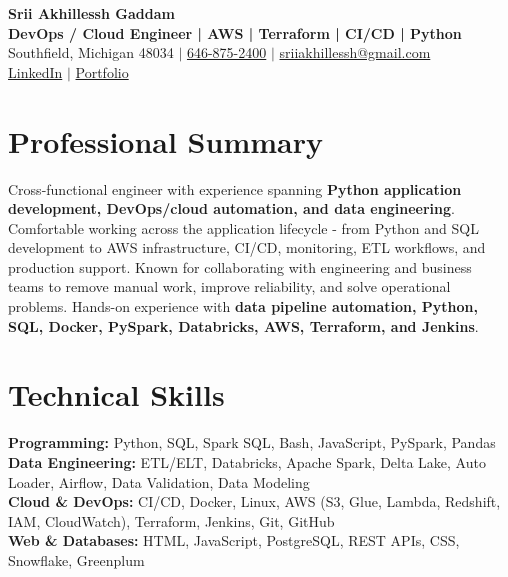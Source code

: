 \documentclass[letterpaper,10pt]{article}
\begin{document}
\fontsize{9.35pt}{10.45pt}\selectfont

\begin{center}
    {\LARGE \textbf{Srii Akhillessh Gaddam}} \\[-1pt]
    \textbf{DevOps / Cloud Engineer | AWS | Terraform | CI/CD | Python} \\[2pt]
    Southfield, Michigan 48034 $|$
    \href{tel:6468752400}{646-875-2400} $|$
    \href{mailto:sriiakhillessh@gmail.com}{sriiakhillessh@gmail.com} \\[1pt]
    \href{https://www.linkedin.com/in/srii-akhiilessh-gaddam-b48668191/}{LinkedIn} $|$
    \href{https://sriiakhillesshg.github.io/portfolio/}{Portfolio}
\end{center}
\vspace{-8pt}

\section{Professional Summary}
\small{Cross-functional engineer with experience spanning \textbf{Python application development, DevOps/cloud automation, and data engineering}. Comfortable working across the application lifecycle - from Python and SQL development to AWS infrastructure, CI/CD, monitoring, ETL workflows, and production support. Known for collaborating with engineering and business teams to remove manual work, improve reliability, and solve operational problems. Hands-on experience with \textbf{data pipeline automation, Python, SQL, Docker, PySpark, Databricks, AWS, Terraform, and Jenkins}.}

\section{Technical Skills}
\small{
\textbf{Programming:} Python, SQL, Spark SQL, Bash, JavaScript, PySpark, Pandas \\
\textbf{Data Engineering:} ETL/ELT, Databricks, Apache Spark, Delta Lake, Auto Loader, Airflow, Data Validation, Data Modeling \\
\textbf{Cloud \& DevOps:} CI/CD, Docker, Linux, AWS (S3, Glue, Lambda, Redshift, IAM, CloudWatch), Terraform, Jenkins, Git, GitHub \\
\textbf{Web \& Databases:} HTML, JavaScript, PostgreSQL, REST APIs, CSS, Snowflake, Greenplum
}
\end{document}
